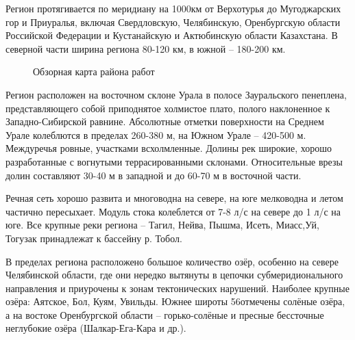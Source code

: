 \documentclass[a4paper,12pt]{article} %
\begin{document}
Регион протягивается по меридиану на 1000км от Верхотурья до Мугоджарских гор и Приуралья, включая Свердловскую, Челябинскую, Оренбургскую области Российской Федерации и Кустанайскую и Актюбинскую области Казахстана. В северной части ширина региона 80-120 км, в южной – 180-200 км.

\begin{figure}[h]
	\caption{Обзорная карта района работ}
\end{figure}

Регион расположен на восточном склоне Урала в полосе Зауральского пенеплена, представляющего собой приподнятое холмистое плато, полого наклоненное к Западно-Сибирской равнине. Абсолютные отметки поверхности на Среднем Урале колеблются в пределах 260-380 м, на Южном Урале – 420-500 м. Междуречья ровные, участками всхолмленные. Долины рек широкие, хорошо разработанные с вогнутыми террасированными склонами. Относительные врезы долин составляют 30-40 м в западной и до 60-70 м в восточной части.

Речная сеть хорошо развита  и многоводна на севере, на юге мелководна и летом частично пересыхает. Модуль стока колеблется от 7-8 л/с на севере до 1 л/с на юге. Все крупные реки региона – Тагил, Нейва, Пышма, Исеть, Миасс,Уй, Тогузак принадлежат к бассейну р. Тобол.

В пределах региона расположено большое количество озёр, особенно на севере Челябинской области, где они нередко вытянуты в цепочки субмеридионального направления и приурочены к зонам тектонических нарушений. Наиболее крупные озёра: Аятское, Бол, Куям, Увильды. Южнее широты 56\degree отмечены солёные озёра, а на востоке Оренбургской области – горько-солёные и пресные бессточные неглубокие озёра (Шалкар-Ега-Кара и др.). 
\end{document}
